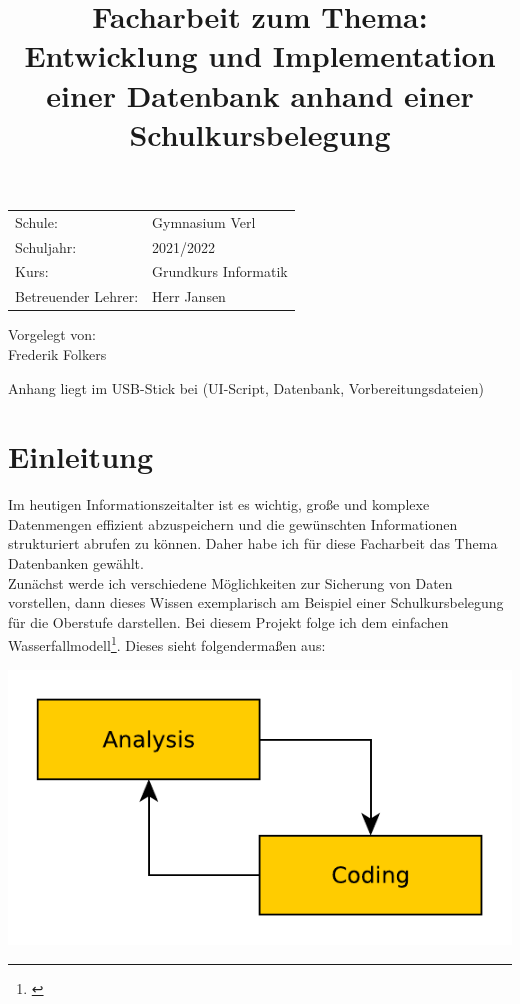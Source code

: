 \documentclass[a4paper, 12pt]{article}
\title{\small Facharbeit zum Thema: \\ \Large Entwicklung und Implementation einer Datenbank anhand einer Schulkursbelegung}
\date{

}
\theoremstyle{plain}
\theoremstyle{definition}
\begin{document}
	\maketitle
	\thispagestyle{empty}
	
	\begin{center}
	\vspace{3cm}
	\begin{tabular}{ll}
	Schule: & Gymnasium Verl \\
	Schuljahr: & 2021/2022\\
	Kurs: & Grundkurs Informatik\\
	Betreuender Lehrer: & Herr Jansen\\
	\end{tabular} 
	\vfill
	Vorgelegt von:\\
	Frederik Folkers
	\end{center}
	\newpage
	\thispagestyle{empty}
	\tableofcontents	
	\vspace{1cm}
	\begin{center}
	Anhang liegt im USB-Stick bei (UI-Script, Datenbank, Vorbereitungsdateien)
	\end{center}
	\newpage	
	
	\onehalfspace
	\section{Einleitung}
	\label{sec:intro}
	Im heutigen Informationszeitalter ist es wichtig, große und komplexe Datenmengen effizient abzuspeichern und die gewünschten Informationen strukturiert abrufen zu können. Daher habe ich für diese Facharbeit das Thema Datenbanken gewählt. \\
	Zunächst werde ich verschiedene Möglichkeiten zur Sicherung von Daten vorstellen, dann dieses Wissen exemplarisch am Beispiel einer Schulkursbelegung für die Oberstufe darstellen. Bei diesem Projekt folge ich dem einfachen Wasserfallmodell\footnote{\cite{projModell}}. Dieses sieht folgendermaßen aus:\\
	\begin{center}
	\includegraphics[scale=0.7]{projModell.pdf}
	\end{center}	
	
\end{document}
